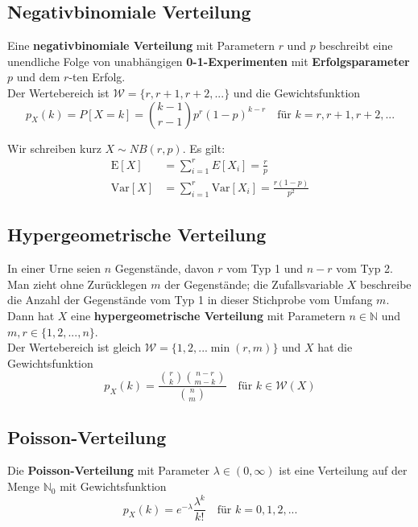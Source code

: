 \documentclass[11pt]{article}
\newcommand{\E}{\text{E}}
\newcommand{\Var}{\text{Var}}
\begin{document}
\subsection{Negativbinomiale Verteilung}

Eine \textbf{negativbinomiale Verteilung} mit Parametern $r$ und $p$ beschreibt eine unendliche Folge von unabh{\"a}ngigen \textbf{0-1-Experimenten} mit \textbf{Erfolgsparameter} $p$ und dem $r$-ten Erfolg. \\
Der Wertebereich ist $\mathcal{W} = \{r, r+1, r+2,...\}$ und die Gewichtsfunktion
\begin{equation*}
	p_X(k) = P[X = k] = \binom{k-1}{r-1}p^r(1-p)^{k-r} \quad\text{f{\"u}r } k = r, r+1, r+2, ...
\end{equation*}

Wir schreiben kurz $X \sim NB(r,p)$. Es gilt:
\begin{equation*}
\begin{split}
	\E[X] & = \sum_{i=1}^r E[X_i] = \frac{r}{p} \\
	\Var[X] & = \sum_{i=1}^r \Var[X_i] = \frac{r(1-p)}{p^2}
\end{split}
\end{equation*}

\subsection{Hypergeometrische Verteilung}

In einer Urne seien $n$ Gegenst{\"a}nde, davon $r$ vom Typ 1 und $n -r$ vom Typ 2. Man zieht ohne Zur{\"u}cklegen $m$ der Gegenst{\"a}nde; die Zufallsvariable $X$ beschreibe die Anzahl der Gegenst{\"a}nde vom Typ 1 in dieser Stichprobe vom Umfang $m$. Dann hat $X$ eine \textbf{hypergeometrische Verteilung} mit Parametern $n \in \mathbb{N}$ und $m,r \in \{1, 2, ..., n\}$. \\
Der Wertebereich ist gleich $\mathcal{W} = \{1, 2,... \min(r, m)\}$ und $X$ hat die Gewichtsfunktion
\begin{equation*}
	p_X(k) = \frac{\binom{r}{k}\binom{n-r}{m-k}}{\binom{n}{m}} \quad \text{f{\"u}r } k \in \mathcal{W}(X)
\end{equation*}

\subsection{Poisson-Verteilung}

Die \textbf{Poisson-Verteilung} mit Parameter $\lambda \in (0, \infty)$ ist eine Verteilung auf der Menge $\mathbb{N}_0$ mit Gewichtsfunktion
\begin{equation*}
	p_X(k) = e^{-\lambda}\frac{\lambda^k}{k!}\quad\text{f{\"u}r } k = 0, 1, 2,...
\end{equation*}
\end{document}
